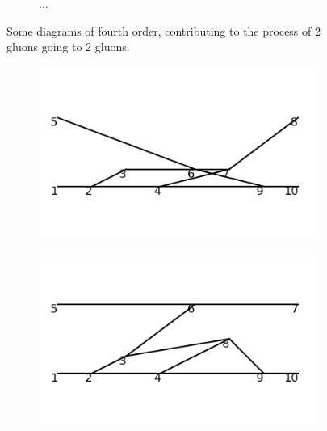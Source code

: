 \documentclass[11pt,a4paper,twoside,pdf]{article}
\numberwithin{equation}{section}
\begin{document}
\begin{figure}[h!]
\begin{subfigure}[t]{0.16\textwidth}
    \end{subfigure}
    \hfill
    \begin{subfigure}[t]{0.1\textwidth}
        \centering
        {\LARGE $\ldots$}
    \end{subfigure}
    \hfill
    \caption{Some diagrams of fourth order, contributing to the process of 
    2 gluons going to 2 gluons.}
    \label{fig:order4_2to2}
\end{figure}

\begin{figure}[h!]
    \centering
    \begin{subfigure}[t]{0.16\textwidth}
        \centering
        \includegraphics[width=\textwidth]{plots/order6_2to2/1.png}
    \end{subfigure}%
    \hfill
    \begin{subfigure}[t]{0.16\textwidth}
        \centering
        \includegraphics[width=\textwidth]{plots/order6_2to2/2.png}
    \end{subfigure}

\end{figure}
\end{document}
